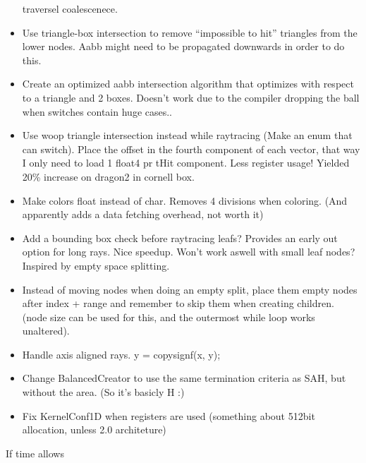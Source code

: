 \begin{itemize}
  traversel coalescenece. \checkmark
\item Use triangle-box intersection to remove ``impossible to hit''
  triangles from the lower nodes. Aabb might need to be propagated
  downwards in order to do this.
\item Create an optimized aabb intersection algorithm that
optimizes with respect to a triangle and 2 boxes. Doesn't work due to
the compiler dropping the ball when switches contain huge cases..
\item Use woop triangle intersection instead while raytracing (Make an
  enum that can switch). Place the offset in the fourth component of
  each vector, that way I only need to load 1 float4 pr tHit
  component. Less register usage! Yielded 20\% increase on dragon2 in
  cornell box.
\item Make colors float instead of char. Removes 4 divisions when
  coloring. (And apparently adds a data fetching overhead, not worth
  it)
\item Add a bounding box check before raytracing leafs? Provides an
  early out option for long rays. Nice speedup. Won't work aswell with
  small leaf nodes? Inspired by empty space splitting.
\item Instead of moving nodes when doing an empty split, place them
  empty nodes after index + range and remember to skip them when
  creating children. (node size can be used for this, and the
  outermost while loop works unaltered).
\item Handle axis aligned rays. y = copysignf(x, y);

\color{red}
\item Change BalancedCreator to use the same termination criteria as SAH, but without the area. (So it's basicly H :)
\item Fix KernelConf1D when registers are used (something about 512bit
  allocation, unless 2.0 architeture)
\end{itemize}

If time allows

